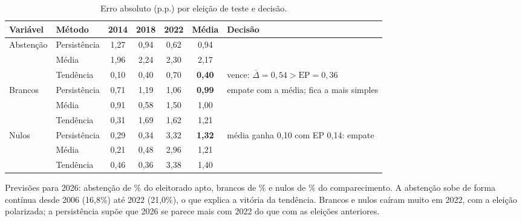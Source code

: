 \documentclass[10.5pt,a4paper]{article}
\begin{document}
\begin{table}[h]
\centering\small
\caption{Erro absoluto (p.p.) por eleição de teste e decisão.}
\begin{tabular}{llccccl}
\toprule
Variável & Método & 2014 & 2018 & 2022 & Média & Decisão \\
\midrule
\multirow{3}{*}{Abstenção} & Persistência & 1,27 & 0,94 & 0,62 & 0,94 & \\
 & Média & 1,96 & 2,24 & 2,30 & 2,17 & \\
 & \cellcolor{azulclaro}Tendência & \cellcolor{azulclaro}0,10 & \cellcolor{azulclaro}0,40 & \cellcolor{azulclaro}0,70 & \cellcolor{azulclaro}\textbf{0,40} & vence: $\bar\Delta=0{,}54>\text{EP}=0{,}36$ \\
\midrule
\multirow{3}{*}{Brancos} & \cellcolor{azulclaro}Persistência & \cellcolor{azulclaro}0,71 & \cellcolor{azulclaro}1,19 & \cellcolor{azulclaro}1,06 & \cellcolor{azulclaro}\textbf{0,99} & empate com a média; fica a mais simples \\
 & Média & 0,91 & 0,58 & 1,50 & 1,00 & \\
 & Tendência & 0,31 & 1,69 & 1,62 & 1,21 & \\
\midrule
\multirow{3}{*}{Nulos} & \cellcolor{azulclaro}Persistência & \cellcolor{azulclaro}0,29 & \cellcolor{azulclaro}0,34 & \cellcolor{azulclaro}3,32 & \cellcolor{azulclaro}\textbf{1,32} & média ganha 0,10 com EP 0,14: empate \\
 & Média & 0,21 & 0,48 & 2,96 & 1,21 & \\
 & Tendência & 0,46 & 0,36 & 3,38 & 1,40 & \\
\bottomrule
\end{tabular}
\end{table}

Previsões para 2026: abstenção de \pAbst\% do eleitorado apto, brancos de \pBrancos\% e nulos de \pNulos\% do comparecimento. A abstenção sobe de forma contínua desde 2006 (16,8\%) até 2022 (21,0\%), o que explica a vitória da tendência. Brancos e nulos caíram muito em 2022, com a eleição polarizada; a persistência supõe que 2026 se parece mais com 2022 do que com as eleições anteriores.

\end{document}
